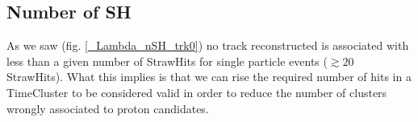 \documentclass[12pt,a4paper,openright, oneside, titlepage]{book} %
\begin{document}
\subsection{Number of SH}
As we saw (fig. \ref{_Lambda_nSH_trk0}) no track reconstructed is associated with less than a given number of StrawHits for single particle events ($\gtrsim 20$ StrawHits). 
What this implies is that we can rise the required number of hits in a TimeCluster to be considered valid in order to reduce the number of clusters wrongly associated to proton candidates.

\begin{comment}
\chapter{Inference}
\section{Beam luminosity}
\subsection{SH counting}
\subsection{Trk counting}
\subsection{Online and/or offline?}
\section{Giani was hoping to include some trigger}
\end{comment}
\end{document}
